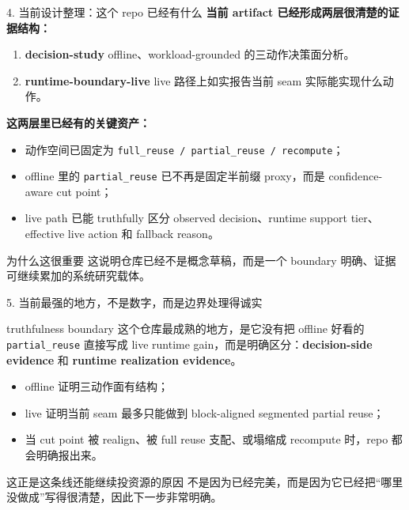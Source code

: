 \documentclass[10pt,aspectratio=169]{ctexbeamer}
\begin{document}
\begin{frame}{4. 当前设计整理：这个 repo 已经有什么}
\textbf{当前 artifact 已经形成两层很清楚的证据结构：}

\vspace{0.3em}
\begin{enumerate}
  \item \textbf{decision-study}
  offline、workload-grounded 的三动作决策面分析。

  \item \textbf{runtime-boundary-live}
  live 路径上如实报告当前 seam 实际能实现什么动作。
\end{enumerate}

\vspace{0.4em}
\textbf{这两层里已经有的关键资产：}
\begin{itemize}
  \item 动作空间已固定为 \texttt{full\_reuse / partial\_reuse / recompute}；
  \item offline 里的 \texttt{partial\_reuse} 已不再是固定半前缀 proxy，而是 confidence-aware cut point；
  \item live path 已能 truthfully 区分 observed decision、runtime support tier、effective live action 和 fallback reason。
\end{itemize}

\vspace{0.4em}
\begin{block}{为什么这很重要}
这说明仓库已经不是概念草稿，而是一个 boundary 明确、证据可继续累加的系统研究载体。
\end{block}
\end{frame}

\begin{frame}{5. 当前最强的地方，不是数字，而是边界处理得诚实}
\begin{block}{truthfulness boundary}
这个仓库最成熟的地方，是它没有把 offline 好看的 \texttt{partial\_reuse} 直接写成 live runtime gain，而是明确区分：\textbf{decision-side evidence} 和 \textbf{runtime realization evidence}。
\end{block}

\begin{itemize}
  \item offline 证明三动作面有结构；
  \item live 证明当前 seam 最多只能做到 block-aligned segmented partial reuse；
  \item 当 cut point 被 realign、被 full reuse 支配、或塌缩成 recompute 时，repo 都会明确报出来。
\end{itemize}

\vspace{0.4em}
\begin{alertblock}{这正是这条线还能继续投资源的原因}
不是因为已经完美，而是因为它已经把“哪里没做成”写得很清楚，因此下一步非常明确。
\end{alertblock}
\end{frame}
\end{document}
